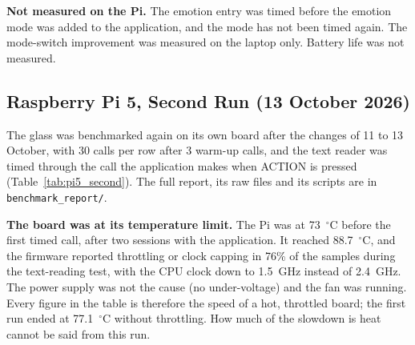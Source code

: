 \textbf{Not measured on the Pi.} The emotion entry was timed before the emotion mode was added to the application, and the mode has not been timed again. The mode-switch improvement was measured on the laptop only. Battery life was not measured.

\subsection{Raspberry Pi 5, Second Run (13 October 2026)}
\label{sec:pi5_second}
The glass was benchmarked again on its own board after the changes of 11 to 13 October, with 30 calls per row after 3 warm-up calls, and the text reader was timed through the call the application makes when ACTION is pressed (Table~\ref{tab:pi5_second}). The full report, its raw files and its scripts are in \texttt{benchmark\_report/}.

\textbf{The board was at its temperature limit.} The Pi was at 73~$^\circ$C before the first timed call, after two sessions with the application. It reached 88.7~$^\circ$C, and the firmware reported throttling or clock capping in 76\% of the samples during the text-reading test, with the CPU clock down to 1.5~GHz instead of 2.4~GHz. The power supply was not the cause (no under-voltage) and the fan was running. Every figure in the table is therefore the speed of a hot, throttled board; the first run ended at 77.1~$^\circ$C without throttling. How much of the slowdown is heat cannot be said from this run.

